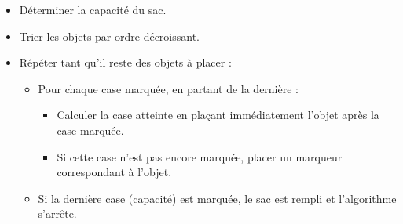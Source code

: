 
\begin{itemize}
  \item Déterminer la capacité du sac.
  \item Trier les objets par ordre décroissant.
  \item Répéter tant qu'il reste des objets à placer :
  \begin{itemize}
    \item Pour chaque case marquée, en partant de la dernière :
    \begin{itemize}
      \item Calculer la case atteinte en plaçant immédiatement l'objet après la case marquée.
      \item Si cette case n'est pas encore marquée, placer un marqueur correspondant à l'objet.
    \end{itemize}
    \item Si la dernière case (capacité) est marquée, le sac est rempli et l'algorithme s'arrête.
  \end{itemize}
\end{itemize}

